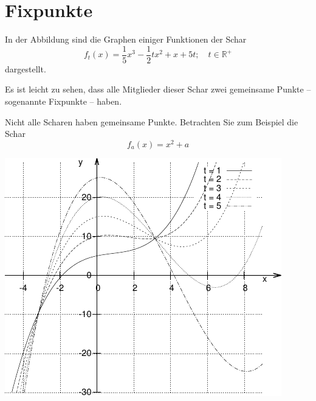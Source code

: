 \documentclass[11pt,a4paper,twoside,fleqn]{article}
\begin{document}
\noindent\begin{minipage}[b]{0.49\linewidth}
\section{Fixpunkte}
In der Abbildung sind die Graphen einiger Funktionen der Schar
$$f_t(x)=\frac 1 5 x^3 -\frac 1 2 tx^2 +x+5t;\quad t\in\mathbb{R}^+$$
dargestellt.

Es ist leicht zu sehen, dass alle Mitglieder dieser Schar zwei
gemeinsame Punkte -- sogenannte Fixpunkte --  haben.

Nicht alle Scharen haben gemeinsame Punkte. Betrachten Sie zum
Beispiel die Schar 
$$f_a(x)=x^2+a$$


\end{minipage}
\hfill
\begin{minipage}[b]{0.5\linewidth}
  \includegraphics[width=1\linewidth]{pics/graph_3}
\end{minipage}
\end{document}
